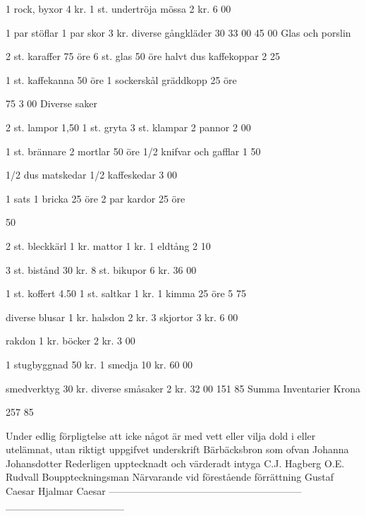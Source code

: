 	

	1 rock, byxor 4 kr. 1 st. undertröja mössa 2 kr.
	6
	00
	

	

	1 par stöflar 1 par skor 3 kr. diverse gångkläder 30
	33
	00
	45
	00
	Glas och porslin
	

	

	

	

	2 st. karaffer 75 öre 6 st. glas 50 öre halvt dus kaffekoppar
	2
	25
	

	

	1 st. kaffekanna 50 öre 1 sockerskål gräddkopp 25 öre
	

	75
	3
	00
	Diverse saker
	

	

	

	

	2 st. lampor 1,50 1 st. gryta 3 st. klampar 2 pannor
	2
	00
	

	

	1 st. brännare 2 mortlar 50 öre 1/2 knifvar och gafflar
	1
	50
	

	

	1/2 dus matskedar 1/2 kaffeskedar
	3
	00
	

	

	1 sats 1 bricka 25 öre 2 par kardor 25 öre
	

	50
	

	

	2 st. bleckkärl 1 kr. mattor 1 kr. 1 eldtång
	2
	10
	

	

	3 st. bistånd 30 kr. 8 st. bikupor 6 kr. 
	36
	00
	

	

	1 st. koffert 4.50 1 st. saltkar 1 kr. 1 kimma 25 öre
	5
	75
	

	

	diverse blusar 1 kr. halsdon 2 kr. 3 skjortor 3 kr. 
	6
	00
	

	

	rakdon 1 kr. böcker 2 kr. 
	3
	00
	

	

	1 stugbyggnad 50 kr. 1 smedja 10 kr.
	60
	00
	

	

	smedverktyg 30 kr. diverse småsaker 2 kr.
	32
	00
	151
	85
	Summa Inventarier Krona
	

	

	257
	85
	

Under edlig förpligtelse att icke något är med vett eller vilja dold i eller utelämnat, utan riktigt uppgifvet underskrift
Bärbäcksbron som ofvan
Johanna Johansdotter
Rederligen upptecknadt och värderadt intyga
C.J. Hagberg                O.E. Rudvall
Bouppteckningsman
Närvarande vid förestående förrättning
Gustaf Caesar                Hjalmar Caesar
-----------------------------------------------------------
________________


